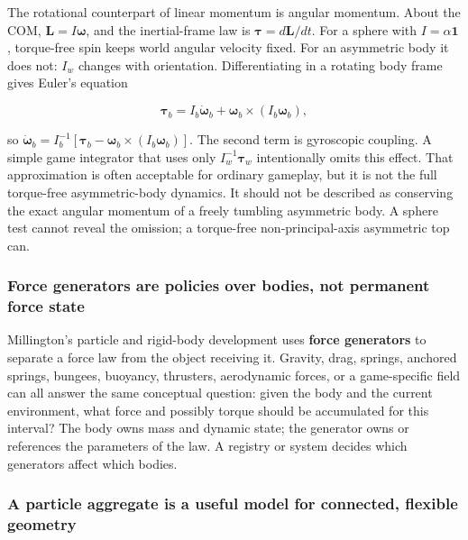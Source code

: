 The rotational counterpart of linear momentum is angular momentum. About the COM, \(\mathbf L=I\boldsymbol\omega\), and the inertial-frame law is \(\boldsymbol\tau=d\mathbf L/dt\). For a sphere with \(I=\alpha\mathbf1\), torque-free spin keeps world angular velocity fixed. For an asymmetric body it does not: \(I_w\) changes with orientation. Differentiating in a rotating body frame gives Euler's equation

\[
\boldsymbol\tau_b=I_b\dot{\boldsymbol\omega}_b+\boldsymbol\omega_b\times(I_b\boldsymbol\omega_b),
\]

so \(\dot{\boldsymbol\omega}_b=I_b^{-1}[\boldsymbol\tau_b-\boldsymbol\omega_b\times(I_b\boldsymbol\omega_b)]\). The second term is gyroscopic coupling. A simple game integrator that uses only \(I_w^{-1}\boldsymbol\tau_w\) intentionally omits this effect. That approximation is often acceptable for ordinary gameplay, but it is not the full torque-free asymmetric-body dynamics. It should not be described as conserving the exact angular momentum of a freely tumbling asymmetric body. A sphere test cannot reveal the omission; a torque-free non-principal-axis asymmetric top can.

\subsubsection{Force generators are policies over bodies, not permanent force state}\label{06-engine-ii-ch034-force-generators-are-policies-over-bodies-not-permanent-force-state}

Millington's particle and rigid-body development uses \textbf{force generators} to separate a force law from the object receiving it. Gravity, drag, springs, anchored springs, bungees, buoyancy, thrusters, aerodynamic forces, or a game-specific field can all answer the same conceptual question: given the body and the current environment, what force and possibly torque should be accumulated for this interval? The body owns mass and dynamic state; the generator owns or references the parameters of the law. A registry or system decides which generators affect which bodies.

\subsubsection{A particle aggregate is a useful model for connected, flexible geometry}\label{06-engine-ii-ch034-a-particle-aggregate-is-a-useful-model-for-connected-flexible-geometry}

